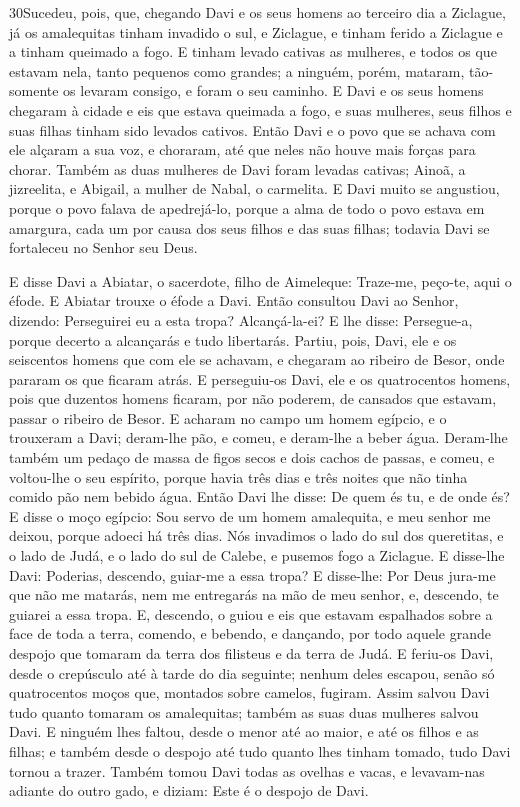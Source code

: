 \medskip

\lettrine{30} Sucedeu, pois, que, chegando Davi e os seus
homens ao terceiro dia a Ziclague, já os amalequitas tinham invadido
o sul, e Ziclague, e tinham ferido a Ziclague e a tinham queimado a
fogo. E tinham levado cativas as mulheres, e todos os que
estavam nela, tanto pequenos como grandes; a ninguém, porém,
mataram, tão-somente os levaram consigo, e foram o seu caminho.
E Davi e os seus homens chegaram à cidade e eis que estava
queimada a fogo, e suas mulheres, seus filhos e suas filhas tinham
sido levados cativos. Então Davi e o povo que se achava com ele
alçaram a sua voz, e choraram, até que neles não houve mais forças
para chorar. Também as duas mulheres de Davi foram levadas
cativas; Ainoã, a jizreelita, e Abigail, a mulher de Nabal, o
carmelita. E Davi muito se angustiou, porque o povo falava de
apedrejá-lo, porque a alma de todo o povo estava em amargura, cada
um por causa dos seus filhos e das suas filhas; todavia Davi se
fortaleceu no Senhor seu Deus.

E disse Davi a Abiatar, o sacerdote, filho de Aimeleque: Traze-me,
peço-te, aqui o éfode. E Abiatar trouxe o éfode a Davi. Então
consultou Davi ao Senhor, dizendo: Perseguirei eu a esta tropa?
Alcançá-la-ei? E lhe disse: Persegue-a, porque decerto a alcançarás
e tudo libertarás. Partiu, pois, Davi, ele e os seiscentos
homens que com ele se achavam, e chegaram ao ribeiro de Besor, onde
pararam os que ficaram atrás. E perseguiu-os Davi, ele e os
quatrocentos homens, pois que duzentos homens ficaram, por não
poderem, de cansados que estavam, passar o ribeiro de Besor.
E acharam no campo um homem egípcio, e o trouxeram a Davi;
deram-lhe pão, e comeu, e deram-lhe a beber água. Deram-lhe
também um pedaço de massa de figos secos e dois cachos de passas, e
comeu, e voltou-lhe o seu espírito, porque havia três dias e três
noites que não tinha comido pão nem bebido água. Então Davi
lhe disse: De quem és tu, e de onde és? E disse o moço egípcio: Sou
servo de um homem amalequita, e meu senhor me deixou, porque adoeci
há três dias. Nós invadimos o lado do sul dos queretitas, e o
lado de Judá, e o lado do sul de Calebe, e pusemos fogo a Ziclague.
E disse-lhe Davi: Poderias, descendo, guiar-me a essa tropa?
E disse-lhe: Por Deus jura-me que não me matarás, nem me entregarás
na mão de meu senhor, e, descendo, te guiarei a essa tropa.
E, descendo, o guiou e eis que estavam espalhados sobre a
face de toda a terra, comendo, e bebendo, e dançando, por todo
aquele grande despojo que tomaram da terra dos filisteus e da terra
de Judá. E feriu-os Davi, desde o crepúsculo até à tarde do
dia seguinte; nenhum deles escapou, senão só quatrocentos moços que,
montados sobre camelos, fugiram. Assim salvou Davi tudo
quanto tomaram os amalequitas; também as suas duas mulheres salvou
Davi. E ninguém lhes faltou, desde o menor até ao maior, e
até os filhos e as filhas; e também desde o despojo até tudo quanto
lhes tinham tomado, tudo Davi tornou a trazer. Também tomou
Davi todas as ovelhas e vacas, e levavam-nas adiante do outro gado,
e diziam: Este é o despojo de Davi.

